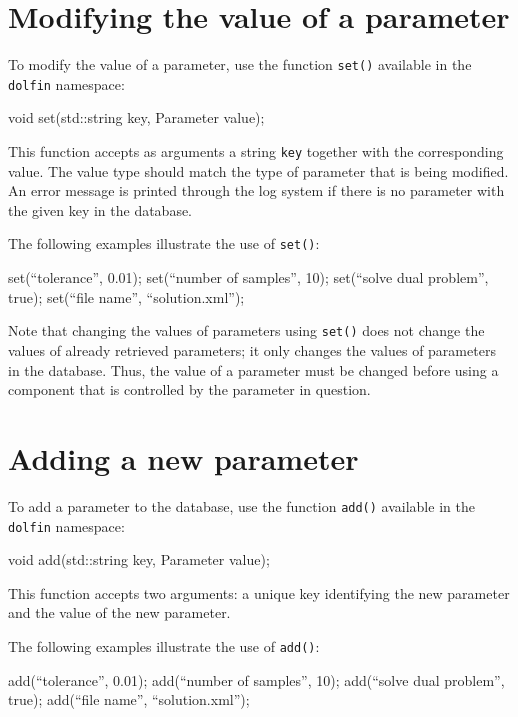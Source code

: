 \section{Modifying the value of a parameter}

To modify the value of a parameter, use the function \texttt{set()}
available in the \texttt{dolfin} namespace:
\begin{code}
  void set(std::string key, Parameter value);
\end{code}
This function accepts as arguments a string \texttt{key} together with
the corresponding value. The value type should match the type of
parameter that is being modified. An error message is
printed through the log system if there is no parameter with the given
key in the database.

The following examples illustrate
the use of \texttt{set()}:
\begin{code}
  set(``tolerance'', 0.01);
  set(``number of samples'', 10);
  set(``solve dual problem'', true);
  set(``file name'', ``solution.xml'');
\end{code}

Note that changing the values of parameters using
\texttt{set()} does not change the values of already retrieved
parameters; it only changes the values of parameters in the
database. Thus, the value of a parameter must be changed before using
a component that is controlled by the parameter in question.

\section{Adding a new parameter}

To add a parameter to the database, use the function
\texttt{add()} available in the \texttt{dolfin}
namespace:
\begin{code}
  void add(std::string key, Parameter value);
\end{code}
This function accepts two arguments:
a unique key identifying the new parameter and the value of the new
parameter.

The following examples illustrate the use of
\texttt{add()}:
\begin{code}
  add(``tolerance'', 0.01);
  add(``number of samples'', 10);
  add(``solve dual problem'', true);
  add(``file name'', ``solution.xml'');
\end{code}

